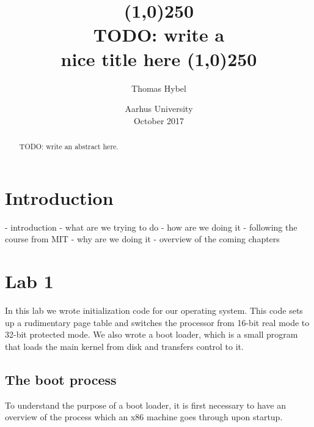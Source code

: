 \documentclass{article}
\title{
\line(1,0){250}\\
\Large \bfseries
TODO: write a \\
nice title here
\line(1,0){250}
}
\author{Thomas Hybel}
\date{Aarhus University \\ October 2017}
\begin{document}
\maketitle

\begin{abstract} 
\noindent 
TODO: write an abstract here.
\end{abstract}
\newpage

\tableofcontents
\newpage
{}




\section{Introduction}


- introduction
	- what are we trying to do
	- how are we doing it
		- following the course from MIT
	- why are we doing it
	- overview of the coming chapters





\section{Lab 1}

In this lab we wrote initialization code for our operating system. This code
sets up a rudimentary page table and switches the processor from 16-bit real
mode to 32-bit protected mode. We also wrote a boot loader, which is a small
program that loads the main kernel from disk and transfers control to it.

\subsection{The boot process}
To understand the purpose of a boot loader, it is first necessary to have an
overview of the process which an x86 machine goes through upon startup.
\end{document}
